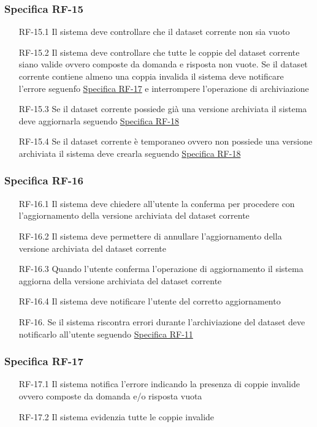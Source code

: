 \subsubsection{Specifica RF-15}
\label{subsubsec:RF-15}
\begin{enumerate}
    \item[RF-15.1] Il sistema deve controllare che il dataset corrente non sia vuoto
    \item[RF-15.2] Il sistema deve controllare che tutte le coppie del dataset corrente siano valide ovvero composte da domanda e risposta non vuote.
    Se il dataset corrente contiene almeno una coppia invalida il sistema deve notificare l'errore seguenfo \hyperref[subsubsec:RF-17]{Specifica RF-17} e interrompere l'operazione di archiviazione
    \item[RF-15.3] Se il dataset corrente possiede già una versione archiviata il sistema deve aggiornarla seguendo \hyperref[subsubsec:RF-18]{Specifica RF-18}
    \item[RF-15.4] Se il dataset corrente è temporaneo ovvero non possiede una versione archiviata il sistema deve crearla seguendo \hyperref[subsubsec:RF-18]{Specifica RF-18} 
\end{enumerate}

\subsubsection{Specifica RF-16}
\label{subsubsec:RF-16}
\begin{enumerate}
    \item[RF-16.1] Il sistema deve chiedere all'utente la conferma per procedere con l'aggiornamento della versione archiviata del dataset corrente 
    \item[RF-16.2] Il sistema deve permettere di annullare l'aggiornamento della versione archiviata del dataset corrente 
    \item[RF-16.3] Quando l'utente conferma l'operazione di aggiornamento il sistema aggiorna della versione archiviata del dataset corrente 
    \item[RF-16.4] Il sistema deve notificare l'utente del corretto aggiornamento
    \item[RF-16.] Se il sistema riscontra errori durante l'archiviazione del dataset deve notificarlo all'utente seguendo \hyperref[subsubsec:RF-11]{Specifica RF-11}
\end{enumerate}

\subsubsection{Specifica RF-17}
\label{subsubsec:RF-17}
\begin{enumerate}
    \item[RF-17.1] Il sistema notifica l'errore indicando la presenza di coppie invalide ovvero composte da domanda e/o risposta vuota
    \item[RF-17.2] Il sistema evidenzia tutte le coppie invalide
\end{enumerate}

